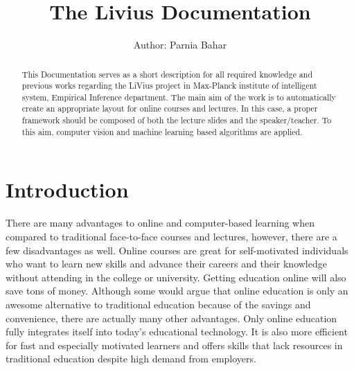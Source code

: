 \documentclass[[12pt,DIV14,BCOR12mm,a4paper,footexclude,headinclude,halfparskip-,twoside,openright,cleardoubleempty,idxtotoc,bibtotoc]{article}
\begin{document}
\title{The Livius Documentation}
\author{Author: Parnia Bahar}

\maketitle

\begin{abstract}
This Documentation serves as a short description for all required knowledge and previous works regarding the LiVius project in Max-Planck institute of intelligent system, Empirical Inference department. The main aim of the work is to automatically create an appropriate layout for online courses and lectures.  In this case, a proper framework should be composed of both the lecture slides and the speaker/teacher. To this aim, computer vision and machine learning  based algorithms are applied.
\end{abstract}

\section{Introduction}

There are many advantages to online and computer-based learning when compared to traditional face-to-face courses and lectures, however, there are a few disadvantages as well.
Online courses are great for self-motivated individuals who want to learn new skills and advance their careers and their knowledge without attending in the college or university. Getting education online will also save tons of money. Although some would argue that online education is only an awesome alternative to traditional education because of the savings and convenience, there are actually many other advantages. Only online education fully integrates itself into today’s educational technology. It is also more efficient for fast and especially motivated learners and offers skills that lack resources in traditional education despite high demand from employers. 
\end{document}

